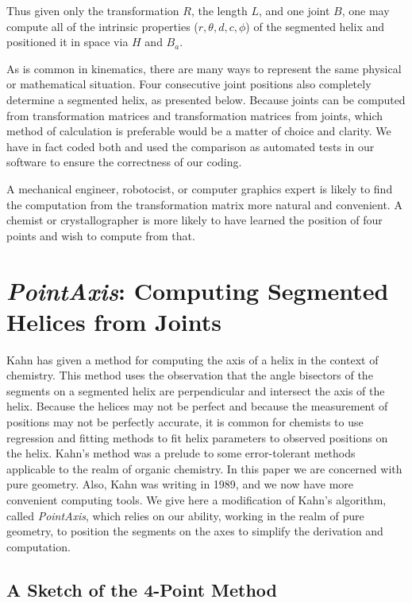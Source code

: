 \documentclass[11pt]{article}
\begin{document}
{Thus given only the transformation $R$, the length $L$, and one
joint $B$, one may compute all of the intrinsic properties
($r,\theta,d,c,\phi$) of
the segmented helix and positioned it in space via $H$ and $B_a$.

As is common in kinematics\cite{funda1990computational}, there are many ways to represent
the same physical or mathematical situation.
Four consecutive joint positions also completely determine a segmented helix, as presented below.
Because joints can be computed from transformation
matrices and transformation matrices from joints,
which method of calculation is preferable would be
a matter of choice and clarity. We have
in fact coded both and used the comparison as automated tests in
our software to ensure
the correctness of our coding.

A mechanical engineer, robotocist, or computer graphics expert is
likely to find the computation from the
transformation matrix more natural and convenient.
A chemist or crystallographer is more likely to
have learned the position of four points and wish to compute from that.

\section{{\em PointAxis}: Computing Segmented Helices from Joints}


Kahn\cite{kahn1989defining} has given a method for computing
the axis of a helix in the context of chemistry.
This method uses the observation that the angle bisectors
of the segments on a segmented helix are perpendicular
and intersect the axis of the helix.
Because the helices may not be perfect and because the measurement of positions may not be perfectly accurate,
it is common for chemists to use regression and fitting methods to fit helix parameters to observed positions
on the helix.
Kahn's method was a prelude to some error-tolerant methods applicable to
the realm of organic chemistry.
In this paper we are concerned with pure geometry. Also, Kahn was writing in 1989,
and we now have more convenient computing tools. We give here a modification of Kahn's algorithm, called {\em PointAxis},
which relies on our ability, working in the realm of pure geometry, to position the segments on the axes
to simplify the derivation and computation.

\subsection{A Sketch of the 4-Point Method}

}
\end{document}
